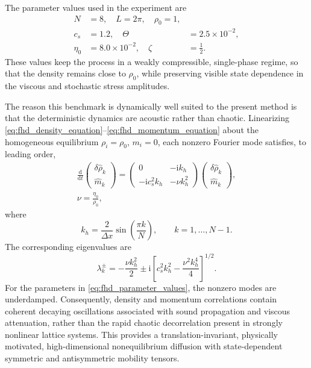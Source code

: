 \documentclass[11pt,twoside,fleqn]{article}
\renewcommand{\d}{\mathrm{d}}
\begin{document}
The parameter values used in the experiment are
\begin{align}
    N &= 8,
    \quad
    L = 2\pi,
    \quad
    \rho_0 = 1,
    \\
    c_s &= 1.2,
    \quad
    \Theta &= 2.5\times 10^{-2},
    \\
    \eta_0 &= 8.0\times 10^{-2},
    \quad
    \zeta &= \frac{1}{2}.
    \label{eq:fhd_parameter_values}
\end{align}
These values keep the process in a weakly compressible, single-phase regime,
so that the density remains close to \(\rho_0\), while preserving visible
state dependence in the viscous and stochastic stress amplitudes.

The reason this benchmark is dynamically well suited to the present method is
that the deterministic dynamics are acoustic rather than chaotic. Linearizing
\eqref{eq:fhd_density_equation}--\eqref{eq:fhd_momentum_equation} about the
homogeneous equilibrium \(\rho_i=\rho_0\), \(m_i=0\), each nonzero Fourier mode
satisfies, to leading order,
\begin{align}
    \frac{\d}{\d t}
    \begin{pmatrix}
        \delta\widehat{\rho}_k\\
        \widehat{m}_k
    \end{pmatrix}
    =
    \begin{pmatrix}
        0 & -\mathrm{i}k_h\\
        -\mathrm{i}c_s^2 k_h & -\nu k_h^2
    \end{pmatrix}
    \begin{pmatrix}
        \delta\widehat{\rho}_k\\
        \widehat{m}_k
    \end{pmatrix}
    ,
    \\
    \nu=\frac{\eta_0}{\rho_0},
    \label{eq:fhd_linearized_mode_equation}
\end{align}
where
\begin{equation}
    k_h
    =
    \frac{2}{\Delta x}
    \sin\left(\frac{\pi k}{N}\right),
    \qquad
    k=1,\ldots,N-1.
    \label{eq:fhd_discrete_wavenumber}
\end{equation}
The corresponding eigenvalues are
\begin{equation}
    \lambda_k^{\pm}
    =
    -\frac{\nu k_h^2}{2}
    \pm
    \mathrm{i}
    \left[
        c_s^2 k_h^2
        -
        \frac{\nu^2 k_h^4}{4}
    \right]^{1/2}.
    \label{eq:fhd_acoustic_eigenvalues}
\end{equation}
For the parameters in \eqref{eq:fhd_parameter_values}, the nonzero modes are
underdamped. Consequently, density and momentum correlations contain coherent
decaying oscillations associated with sound propagation and viscous attenuation,
rather than the rapid chaotic decorrelation present in strongly nonlinear
lattice systems. This provides a translation-invariant, physically motivated,
high-dimensional nonequilibrium diffusion with state-dependent symmetric and
antisymmetric mobility tensors.
\end{document}
